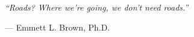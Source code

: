 \thispagestyle{empty}
\null\vfill
\begin{flushright}
  \begin{minipage}{0.6\textwidth}
    \raggedleft
    \itshape
    ``Roads? Where we're going, we don't need roads.''
    \par\vspace{0.8em}
    \upshape\small --- Emmett L. Brown, Ph.D.
  \end{minipage}
\end{flushright}
\vfill\clearpage
